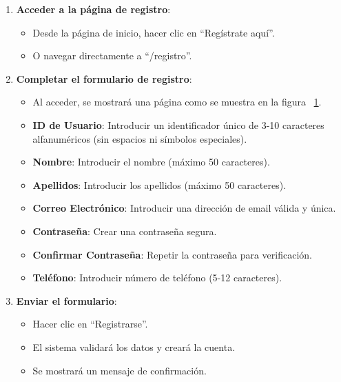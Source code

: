 \begin{enumerate}
   \item \textbf{Acceder a la página de registro}:

   \begin{itemize}
      \item Desde la página de inicio, hacer clic en ``Regístrate aquí''.
      \item O navegar directamente a ``/registro''.
   \end{itemize}
   \item \textbf{Completar el formulario de registro}:
   \begin{itemize}

      \begin{figure}[H]
         \centering
         \texttt{[image: reservapp\_registro]}
         \caption{Página para el registro de usuario.}
         \label{fig:reservapp_registro}
      \end{figure}

      \item Al acceder, se mostrará una página como se muestra en la figura ~\ref{fig:reservapp_registro}.
      \item \textbf{ID de Usuario}: Introducir un identificador único de 3-10 caracteres alfanuméricos (sin espacios ni símbolos especiales).
      \item \textbf{Nombre}: Introducir el nombre (máximo 50 caracteres).
      \item \textbf{Apellidos}: Introducir los apellidos (máximo 50 caracteres).
      \item \textbf{Correo Electrónico}: Introducir una dirección de email válida y única.
      \item \textbf{Contraseña}: Crear una contraseña segura.
      \item \textbf{Confirmar Contraseña}: Repetir la contraseña para verificación.
      \item \textbf{Teléfono}: Introducir número de teléfono (5-12 caracteres).
   \end{itemize}
   \item \textbf{Enviar el formulario}:
   \begin{itemize}
      \item Hacer clic en ``Registrarse''.
      \item El sistema validará los datos y creará la cuenta.
      \item Se mostrará un mensaje de confirmación.
   \end{itemize}
\end{enumerate}

